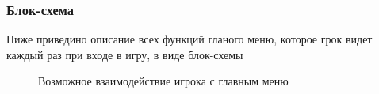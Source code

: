 \documentclass{article}
\begin{document}
\subsubsection{Блок-схема}
Ниже приведино описание всех функций гланого меню, которое грок видет каждый раз при входе в игру, в виде блок-схемы

\begin{figure}[h]
    \caption{Возможное взаимодействие игрока с главным меню}
    \label{ris:image}
\end{figure}
\end{document}
